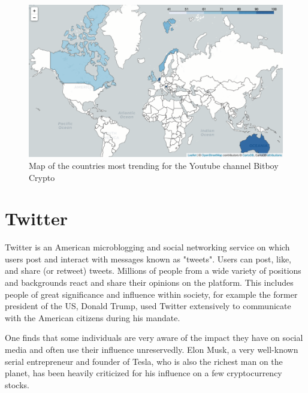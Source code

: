 \documentclass[twoside]{report}
\begin{document}
\begin{spacing}{1}
\begin{figure}[!htbp]
    \centering
    \includegraphics[scale = 0.4]{Images/countries_map_2.png}
    \caption{Map of the countries most trending for the Youtube channel Bitboy Crypto}
    \label{countries_map_2}
\end{figure}


\section{Twitter}\label{sec:twitter}
Twitter is an American microblogging and social networking service on which users post and interact with messages known as "tweets". Users can post, like, and share (or retweet) tweets. Millions of people from a wide variety of positions and backgrounds react and share their opinions on the platform. This includes people of great significance  and influence within society, for example the former president of the US, Donald Trump, used Twitter extensively to communicate with the American citizens during his mandate.

One finds that some individuals are very aware of the impact they have on social media and often use their influence unreservedly. Elon Musk, a very well-known serial entrepreneur and founder of Tesla, who is also the richest man on the planet, has been heavily criticized for his influence on a few cryptocurrency stocks. %


\end{spacing}
\end{document}
